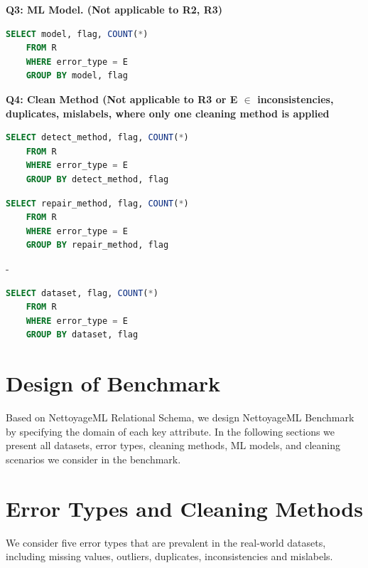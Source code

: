 \textbf{Q3: ML Model. (Not applicable to R2, R3)}
\begin{lstlisting}[language=SQL, caption=Q3: ML Model]
	SELECT model, flag, COUNT(*)
	FROM R
	WHERE error_type = E
	GROUP BY model, flag
\end{lstlisting}

\textbf{Q4: Clean Method (Not applicable to R3 or E $\in$ { inconsistencies, duplicates, mislabels}, where only one cleaning method is applied}
\begin{lstlisting}[language=SQL, caption=Q4.1:Detect Method]
	SELECT detect_method, flag, COUNT(*)
	FROM R
	WHERE error_type = E
	GROUP BY detect_method, flag
\end{lstlisting}

\begin{lstlisting}[language=SQL, caption=Q4.2:Repair Method]
	SELECT repair_method, flag, COUNT(*)
	FROM R
	WHERE error_type = E
	GROUP BY repair_method, flag
\end{lstlisting}
-\\
\begin{lstlisting}[language=SQL, caption=Q5: Dataset]
	SELECT dataset, flag, COUNT(*)
	FROM R
	WHERE error_type = E
	GROUP BY dataset, flag
\end{lstlisting}

\section{Design of Benchmark}

Based on NettoyageML Relational Schema, we design NettoyageML Benchmark by specifying the domain of each key attribute. In the following sections we present all datasets, error types, cleaning methods, ML models, and cleaning scenarios we consider in the benchmark.

\section{Error Types and Cleaning Methods}
We consider five error types that are prevalent in the real-world
datasets, including missing values, outliers, duplicates, inconsistencies and mislabels. 

